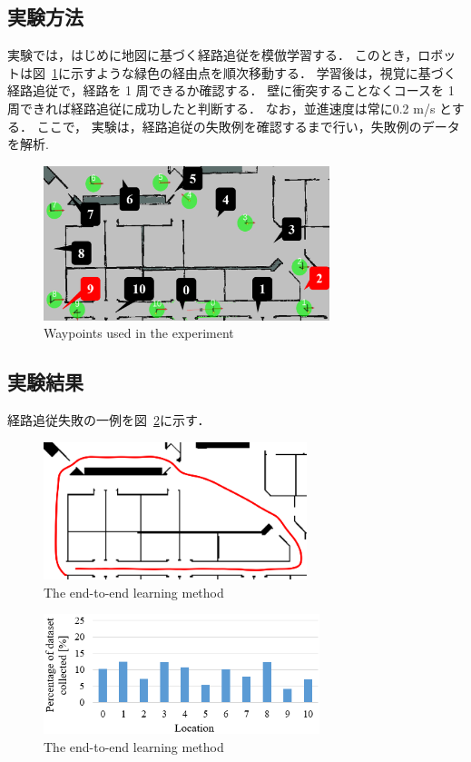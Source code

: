 \documentclass{jarticle}
\renewcommand{\figurename}{図~}
\newcommand{\figref}[1]{\figurename\ref{#1}}
\begin{document}
\subsection{実験方法}
実験では，はじめに地図に基づく経路追従を模倣学習する．
このとき，ロボットは\figref{fig:6}に示すような緑色の経由点を順次移動する．
学習後は，視覚に基づく経路追従で，経路を 1 周できるか確認する．
壁に衝突することなくコースを 1 周できれば経路追従に成功したと判断する．
なお，並進速度は常に0.2 m/s とする．
ここで，
実験は，経路追従の失敗例を確認するまで行い，失敗例のデータを解析.

\begin{figure}[h!]
  \centering
   \includegraphics[height=45mm]{./png/location.png}
   \caption{Waypoints used in the experiment}
   \label{fig:6}
\end{figure}

\subsection{実験結果}
経路追従失敗の一例を\figref{fig:7}に示す．

\begin{figure}[h!]
  \centering
   \includegraphics[height=40mm]{./png/failed.png}
   \caption{The end-to-end learning method}
   \label{fig:7}
\end{figure}

\newpage

\begin{figure}[h!]
  \centering
   \includegraphics[height=35mm]{./png/set2.png}
   \caption{The end-to-end learning method}
\end{figure}
\end{document}
